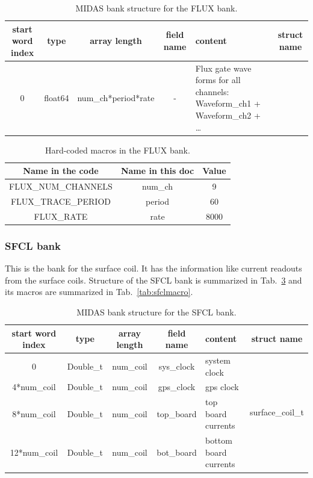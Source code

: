 \begin{table}[htbp]
\centering
\caption{MIDAS bank structure for the FLUX bank.}
\begin{tabular}{|c|c|c|c|p{3cm}|c|}
\hline
start word index & type    & array length        & field name & content                                                                  & struct name \\
\hline
0                & float64 & num\_ch*period*rate & -          & Flux gate wave forms for all channels: Waveform\_ch1 + Waveform\_ch2 + … &     \\
\hline        
\end{tabular}
\label{tab:fluxtable}
\end{table}

\begin{table}[htbp]
\centering
\caption{Hard-coded macros in the FLUX bank.}
\begin{tabular}{|c|c|c|}
\hline
Name in the code    & Name in this doc & Value \\
\hline
FLUX\_NUM\_CHANNELS & num\_ch          & 9     \\
\hline
FLUX\_TRACE\_PERIOD & period           & 60    \\
\hline
FLUX\_RATE          & rate             & 8000 \\
\hline
\end{tabular} 
\label{tab:fluxmacro}
\end{table}

\subsubsection*{SFCL bank}

This is the bank for the surface coil. It has the information like current readouts from the surface coils. Structure of the SFCL bank is summarized in Tab.~\ref{tab:sfcltable} and its macros are summarized in Tab.~\ref{tab:sfclmacro}.

\begin{table}[htbp]
\centering
\caption{MIDAS bank structure for the SFCL bank.}
\begin{tabular}{|c|c|c|c|p{3cm}|c|}
\hline
start word index & type      & array length & field name & content               & struct name \\
\hline
0                & Double\_t & num\_coil    & sys\_clock & system clock          & \multirow{4}{*}{surface\_coil\_t}     \\
\cline{1-5}
4*num\_coil      & Double\_t & num\_coil    & gps\_clock & gps clock             &                             \\
\cline{1-5}
8*num\_coil      & Double\_t & num\_coil    & top\_board & top board currents    &                             \\
\cline{1-5}
12*num\_coil     & Double\_t & num\_coil    & bot\_board & bottom board currents & \\
\hline        
\end{tabular}
\label{tab:sfcltable}
\end{table}


